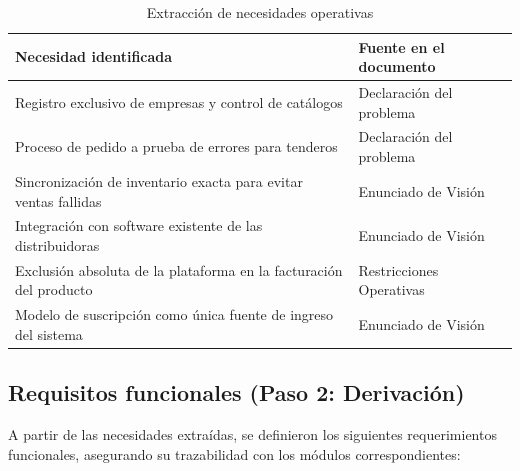\documentclass[12pt,a4paper]{article}
\begin{document}
\begin{table}[H]
    \centering
    \begin{tabularx}{\textwidth}{|X|X|}
        \hline
        \textbf{Necesidad identificada} & \textbf{Fuente en el documento} \\ \hline
        Registro exclusivo de empresas y control de catálogos & Declaración del problema \\ \hline
        Proceso de pedido a prueba de errores para tenderos & Declaración del problema \\ \hline
        Sincronización de inventario exacta para evitar ventas fallidas & Enunciado de Visión \\ \hline
        Integración con software existente de las distribuidoras & Enunciado de Visión \\ \hline
        Exclusión absoluta de la plataforma en la facturación del producto & Restricciones Operativas \\ \hline
        Modelo de suscripción como única fuente de ingreso del sistema & Enunciado de Visión \\ \hline
    \end{tabularx}
    \caption{Extracción de necesidades operativas}
\end{table}

\subsection{Requisitos funcionales (Paso 2: Derivación)}
A partir de las necesidades extraídas, se definieron los siguientes requerimientos funcionales, asegurando su trazabilidad con los módulos correspondientes:
\end{document}
